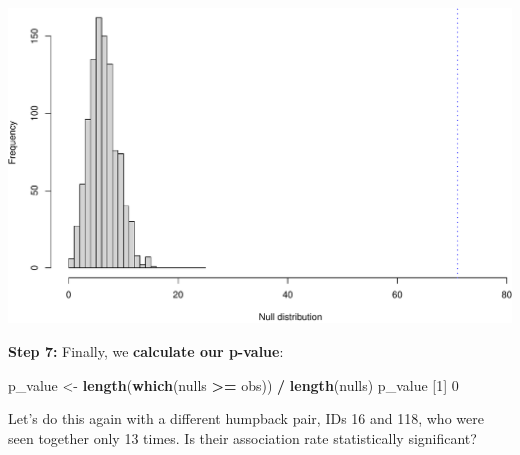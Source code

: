 \documentclass[]{book}
\newenvironment{Shaded}{\begin{snugshade}}{\end{snugshade}}
\newcommand{\DecValTok}[1]{\textcolor[rgb]{0.00,0.00,0.81}{#1}}
\newcommand{\KeywordTok}[1]{\textcolor[rgb]{0.13,0.29,0.53}{\textbf{#1}}}
\newcommand{\NormalTok}[1]{#1}
\newcommand{\OperatorTok}[1]{\textcolor[rgb]{0.81,0.36,0.00}{\textbf{#1}}}
\newcommand{\StringTok}[1]{\textcolor[rgb]{0.31,0.60,0.02}{#1}}
\begin{document}
\includegraphics{figures/unnamed-chunk-682-1.pdf}

\textbf{Step 7:} Finally, we \textbf{calculate our p-value}:

\begin{Shaded}
\begin{Highlighting}[]
\NormalTok{p_value <-}\StringTok{ }\KeywordTok{length}\NormalTok{(}\KeywordTok{which}\NormalTok{(nulls }\OperatorTok{>=}\StringTok{ }\NormalTok{obs)) }\OperatorTok{/}\StringTok{ }\KeywordTok{length}\NormalTok{(nulls)}
\NormalTok{p_value}
\NormalTok{[}\DecValTok{1}\NormalTok{] }\DecValTok{0}
\end{Highlighting}
\end{Shaded}

Let's do this again with a different humpback pair, IDs 16 and 118, who were seen together only 13 times. Is their association rate statistically significant?
\end{document}
